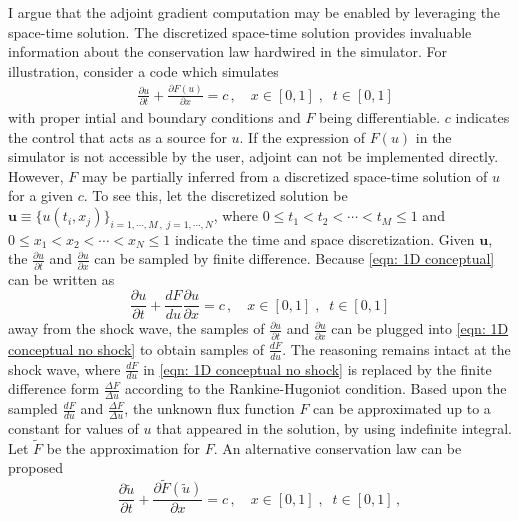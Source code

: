 I argue that the adjoint gradient computation may be enabled by leveraging the space-time solution.
The discretized space-time solution provides invaluable information about the conservation law
hardwired in the simulator. For illustration, consider a code which simulates
\begin{equation}\begin{split}
    &\frac{\partial u}{\partial t} + \frac{\partial F(u)}{\partial x} = c\,,\quad
    x \in [0,1] \;, \;\; t\in[0,1]
    \label{eqn: 1D conceptual}
\end{split}\end{equation}
with proper intial and boundary conditions and $F$ being differentiable. 
$c$ indicates the control that acts as a source for $u$.
If the expression of $F(u)$ in the simulator is not accessible by the user, 
adjoint can not be implemented directly. However, $F$ may be partially inferred from 
a discretized space-time solution of $u$ for a given $c$.
To see this, let the discretized solution be $\boldsymbol{u}\equiv \{u(t_i, x_j)\}_{i=1,\cdots,M\,,\; j=1,\cdots, N}$,
where $0\le t_1 < t_2 < \cdots < t_M \le 1$ and $0 \le x_1 < x_2 < \cdots < x_N \le 1$ indicate the time and space discretization. 
Given $\boldsymbol{u}$, the $\frac{\partial u}{\partial t}$ and $\frac{\partial u}{\partial x}$ can be sampled by finite difference.
Because \eqref{eqn: 1D conceptual} can be written as
\begin{equation}
    \frac{\partial u}{\partial t} + \frac{d F}{du} \frac{\partial u}{\partial x} = c\,,\quad
    x \in [0,1] \;, \;\; t\in[0,1]
    \label{eqn: 1D conceptual no shock}
\end{equation}
away from the shock wave, the samples of $\frac{\partial u}{\partial t}$ and $\frac{\partial u}{\partial x}$
can be plugged into \eqref{eqn: 1D conceptual no shock} to obtain samples of $\frac{dF}{du}$.
The reasoning remains intact at the shock wave, where $\frac{dF}{du}$ in \eqref{eqn: 1D conceptual no shock} is 
replaced by the finite difference form $\frac{\Delta F}{\Delta u}$ according to the Rankine-Hugoniot condition.
Based upon the sampled $\frac{dF}{du}$ and $\frac{\Delta F}{\Delta u}$, the unknown flux function $F$
can be approximated up to a constant 
for values of $u$ that appeared in the solution, 
by using indefinite integral. Let $\tilde{F}$ be the approximation for $F$.
An alternative conservation law can be proposed
\begin{equation}
    \frac{\partial \tilde{u}}{\partial t} + \frac{\partial \tilde{F}(\tilde{u})}{\partial x} = c\,,\quad
    x \in [0,1] \;, \;\; t\in[0,1]\,,
    \label{eqn: 1D conceptual inferred}
\end{equation}
